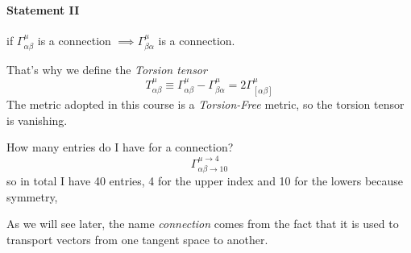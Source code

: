 \paragraph{Statement II} if $\Gamma ^{\mu }_{\alpha \beta }$ is a connection $\implies  \Gamma ^{\mu }_{\beta  \alpha }$ is a connection.\par
That's why we define the \emph{ Torsion tensor}
\[
	T^{\mu }_{\alpha \beta }\equiv \Gamma  ^{\mu }_{\alpha \beta } - \Gamma ^{\mu }_{\beta  \alpha } = 2 \Gamma ^{\mu }_{[\alpha \beta ]}
\]
The metric adopted in this course is a \emph{ Torsion-Free} metric, so the torsion tensor is vanishing.\par
How many entries do I have for a connection?
\[
\Gamma ^{\mu \to 4}_{\alpha \beta \to 10}
\]
so in total I have 40 entries, 4 for the upper index and 10 for the lowers because symmetry, \par

As we will see later, the name \emph{connection} comes from the fact that it is used to transport vectors from one tangent space to another.

